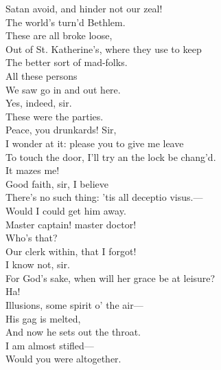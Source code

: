 \documentclass[a4paper,oneside]{memoir}
\begin{document}
\begin{drama*}
\ananiasspeaks Satan avoid, and hinder not our zeal!\\
\lovewitspeaks The world's turn'd Bethlem.\\
\facespeaks {} These are all broke loose,\\
Out of St. Katherine's, where they use to keep\\
The better sort of mad-folks.\\
\neighonespeaks {} All these persons\\
We saw go in and out here.\\
\neightwospeaks {} Yes, indeed, sir.\\
\neighthreespeaks These were the parties.\\
\facespeaks {} Peace, you drunkards! Sir,\\
I wonder at it: please you to give me leave\\
To touch the door, I'll try an the lock be chang'd.\\
\lovewitspeaks It mazes me!\\
\facespeaks {} Good faith, sir, I believe\\
There's no such thing: 'tis all deceptio visus.---\\
Would I could get him away.\\
\dapperspeaks {} Master captain! master doctor!\\
\lovewitspeaks {} Who's that?\\
\facespeaks {} Our clerk within, that I forgot!\\
I know not, sir.\\
\dapperspeaks {} For God's sake, when will her grace be at leisure?\\
\facespeaks {} Ha!\\
Illusions, some spirit o' the air---\\
His gag is melted,\\
And now he sets out the throat.\\
\dapperspeaks {} I am almost stifled---\\
\facespeaks {} Would you were altogether.\\

\end{drama*}
\end{document}
